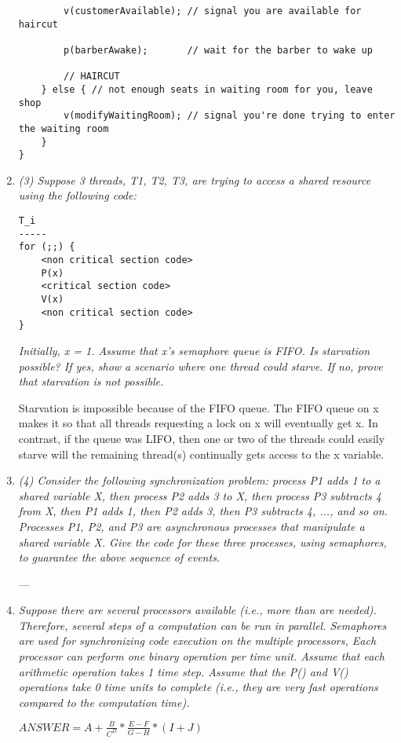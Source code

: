 \documentclass[letterpaper,11pt]{article}
\begin{document}
\begin{enumerate}
\begin{verbatim}
        v(customerAvailable); // signal you are available for haircut

        p(barberAwake);       // wait for the barber to wake up

        // HAIRCUT
    } else { // not enough seats in waiting room for you, leave shop
        v(modifyWaitingRoom); // signal you're done trying to enter the waiting room
    }
}
\end{verbatim}
\item \emph{(3) Suppose 3 threads, T1, T2, T3, are trying to access a shared resource using the following code:}
\begin{verbatim}
T_i
-----
for (;;) {
    <non critical section code>
    P(x)
    <critical section code>
    V(x)
    <non critical section code>
}
\end{verbatim}
\emph{Initially, x = 1. Assume that x’s semaphore queue is FIFO. Is starvation possible? If yes, show a scenario where one thread could starve. If no, prove that starvation is not possible.}

Starvation is impossible because of the FIFO queue.  The FIFO queue on x makes it so that all threads requesting a lock on x will eventually get x.  In contrast, if the queue was LIFO, then one or two of the threads could easily starve will the remaining thread(s) continually gets access to the x variable.
\item \emph{(4) Consider the following synchronization problem: process P1 adds 1 to a shared variable X, then process P2 adds 3 to X, then process P3 subtracts 4 from X, then P1 adds 1, then P2 adds 3, then P3 subtracts 4, ..., and so on. Processes P1, P2, and P3 are asynchronous processes that manipulate a shared variable X. Give the code for these three processes, using
semaphores, to guarantee the above sequence of events.}

---
\item \emph{Suppose there are several processors available (i.e., more than are needed). Therefore, several steps of a computation can be run in parallel. Semaphores are used for synchronizing code execution on the multiple processors, Each processor can perform one binary operation per time unit. Assume that each arithmetic operation takes 1 time step. Assume that the P() and V() operations take 0 time units to complete (i.e., they are very fast operations compared to the computation time).}

\begin{center}
$ANSWER = A + \frac{B}{C^D} * \frac{E-F}{G-H} * (I+J)$
\end{center}


\end{enumerate}
\end{document}
